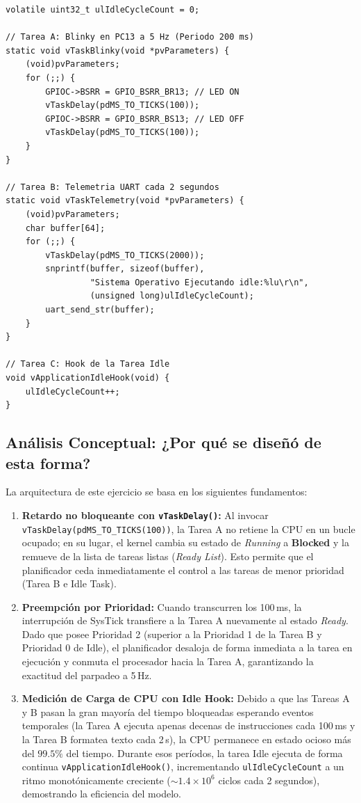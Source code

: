 \documentclass{plantilla}
\begin{document}
\begin{lstlisting}[caption={Fragmento principal del Ejercicio 1 (\texttt{act1/src/main.c})}, label=lst_ej1]
volatile uint32_t ulIdleCycleCount = 0;

// Tarea A: Blinky en PC13 a 5 Hz (Periodo 200 ms)
static void vTaskBlinky(void *pvParameters) {
    (void)pvParameters;
    for (;;) {
        GPIOC->BSRR = GPIO_BSRR_BR13; // LED ON
        vTaskDelay(pdMS_TO_TICKS(100));
        GPIOC->BSRR = GPIO_BSRR_BS13; // LED OFF
        vTaskDelay(pdMS_TO_TICKS(100));
    }
}

// Tarea B: Telemetria UART cada 2 segundos
static void vTaskTelemetry(void *pvParameters) {
    (void)pvParameters;
    char buffer[64];
    for (;;) {
        vTaskDelay(pdMS_TO_TICKS(2000));
        snprintf(buffer, sizeof(buffer), 
                 "Sistema Operativo Ejecutando idle:%lu\r\n", 
                 (unsigned long)ulIdleCycleCount);
        uart_send_str(buffer);
    }
}

// Tarea C: Hook de la Tarea Idle
void vApplicationIdleHook(void) {
    ulIdleCycleCount++;
}
\end{lstlisting}

\subsection{Análisis Conceptual: ¿Por qué se diseñó de esta forma?}
La arquitectura de este ejercicio se basa en los siguientes fundamentos:
\begin{enumerate}
    \item \textbf{Retardo no bloqueante con \texttt{vTaskDelay()}:} Al invocar \texttt{vTaskDelay(pdMS\_TO\_TICKS(100))}, la Tarea A no retiene la CPU en un bucle ocupado; en su lugar, el kernel cambia su estado de \textit{Running} a \textbf{Blocked} y la remueve de la lista de tareas listas (\textit{Ready List}). Esto permite que el planificador ceda inmediatamente el control a las tareas de menor prioridad (Tarea B e Idle Task).
    \item \textbf{Preempción por Prioridad:} Cuando transcurren los 100\,ms, la interrupción de SysTick transfiere a la Tarea A nuevamente al estado \textit{Ready}. Dado que posee Prioridad 2 (superior a la Prioridad 1 de la Tarea B y Prioridad 0 de Idle), el planificador desaloja de forma inmediata a la tarea en ejecución y conmuta el procesador hacia la Tarea A, garantizando la exactitud del parpadeo a 5\,Hz.
    \item \textbf{Medición de Carga de CPU con Idle Hook:} Debido a que las Tareas A y B pasan la gran mayoría del tiempo bloqueadas esperando eventos temporales (la Tarea A ejecuta apenas decenas de instrucciones cada 100\,ms y la Tarea B formatea texto cada 2\,s), la CPU permanece en estado ocioso más del $99.5\%$ del tiempo. Durante esos períodos, la tarea Idle ejecuta de forma continua \texttt{vApplicationIdleHook()}, incrementando \texttt{ulIdleCycleCount} a un ritmo monotónicamente creciente ($\sim 1.4 \times 10^6$ ciclos cada 2 segundos), demostrando la eficiencia del modelo.
\end{enumerate}
\end{document}
